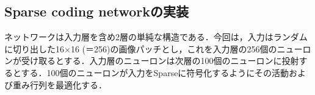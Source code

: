 \subsection{Sparse coding networkの実装}ネットワークは入力層を含め2層の単純な構造である．今回は，入力はランダムに切り出した16×16 (＝256)の画像パッチとし，これを入力層の256個のニューロンが受け取るとする．入力層のニューロンは次層の100個のニューロンに投射するとする．100個のニューロンが入力をSparseに符号化するようにその活動および重み行列を最適化する．